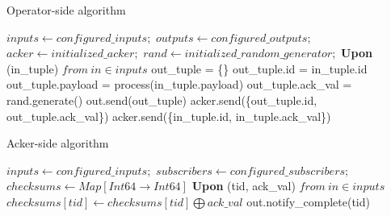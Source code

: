 \label{fs-acker-design}







\begin{algorithm}
\caption{Operator-side algorithm}
\label{operator_side_algo}
\begin{algorithmic}[1]
\State $inputs \leftarrow configured\_inputs;$ 
\State $outputs \leftarrow configured\_outputs;$
\State $acker \leftarrow initialized\_acker;$
\State $rand \leftarrow initialized\_random\_generator;$
\State \textbf{Upon} (in\_tuple) $from \ in\in inputs$
\Indent
    \State out\_tuple = \{\}
    \State out\_tuple.id = in\_tuple.id
    \State out\_tuple.payload = process(in\_tuple.payload)
    \State out\_tuple.ack\_val = rand.generate()
        \State out.send(out\_tuple)
        \State acker.send(\{out\_tuple.id, out\_tuple.ack\_val\})
    \EndFor
    \State acker.send(\{in\_tuple.id, in\_tuple.ack\_val\})
\EndIndent
\end{algorithmic}
\end{algorithm}

\begin{algorithm}
\caption{Acker-side algorithm}
\label{acker_side_algo}
\begin{algorithmic}[1]
\State $inputs \leftarrow configured\_inputs;$ 
\State $subscribers \leftarrow configured\_subscribers;$
\State $checksums \leftarrow Map[Int64 \rightarrow Int64]$
\State \textbf{Upon} (tid, ack\_val) $from \ in\in inputs$
\Indent
    \State $checksums[tid] \gets checksums[tid] \bigoplus ack\_val$
            \State out.notify\_complete(tid)
        \EndFor
    \EndIf
\EndIndent
\end{algorithmic}
\end{algorithm}

